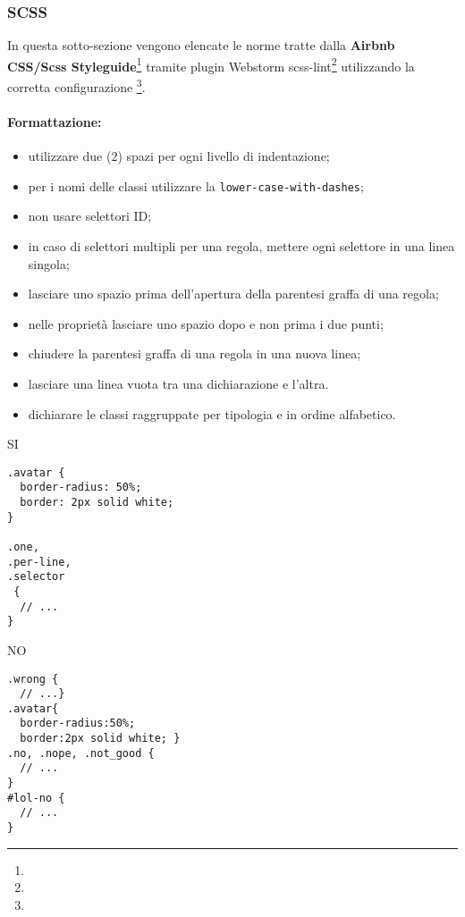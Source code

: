 \documentclass[../ProcessiPrimari.tex]{subfiles}
\begin{document}
	
\subsubsection{SCSS}
In questa sotto-sezione vengono elencate le norme tratte dalla \textbf{Airbnb\\ CSS/Scss Styleguide}\footnote{} tramite plugin Webstorm scss-lint\footnote{} utilizzando la corretta configurazione \footnote{}.
\paragraph*{Formattazione:}
\begin{itemize}
	\item utilizzare due (2) spazi per ogni livello di indentazione;
	\item per i nomi delle classi utilizzare la \texttt{lower-case-with-dashes};
	\item non usare selettori ID;
	\item in caso di selettori multipli per una regola, mettere ogni selettore in una linea singola;
	\item lasciare uno spazio prima dell'apertura della parentesi graffa di una regola;
	\item nelle proprietà lasciare uno spazio dopo e non prima i due punti;
	\item chiudere la parentesi graffa di una regola in una nuova linea;
	\item lasciare una linea vuota tra una dichiarazione e l'altra.
	\item dichiarare le classi raggruppate per tipologia e in ordine alfabetico.
\end{itemize}
\begin{center}{
\begin{minipage}{6cm}
{\begin{center}SI\end{center}}
\begin{Verbatim}[frame=single]
.avatar {
  border-radius: 50%;
  border: 2px solid white;
}

.one,
.per-line,
.selector
 {
  // ...
}
\end{Verbatim}
\end{minipage}
\hfil
\begin{minipage}{7cm}
{\begin{center}NO\end{center}}
\begin{Verbatim}[frame=single]
.wrong {
  // ...}
.avatar{
  border-radius:50%;
  border:2px solid white; }
.no, .nope, .not_good {
  // ...
}
#lol-no {
  // ...
}

\end{Verbatim}
\end{minipage}
}
\end{center}
\end{document}
